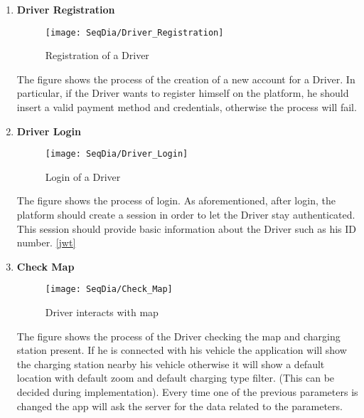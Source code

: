 \begin{enumerate}
        \newpage
        \item \textbf{Driver Registration}
        \begin{figure}[H]
            \begin{center}
            \texttt{[image: SeqDia/Driver\_Registration]}
            \caption{Registration of a Driver}
            \label{fig:DriverRegistration}
            \end{center}
        \end{figure}
        The figure shows the process of the creation of a new account for a Driver. In particular, if the Driver wants to register himself on the platform, he should insert a valid payment method and credentials, otherwise the process will fail.
        \newpage
        \item \textbf{Driver Login}
        \begin{figure}[H]
            \begin{center}
            \texttt{[image: SeqDia/Driver\_Login]}
            \caption{Login of a Driver}
            \label{fig:DriverLogin}
            \end{center}
        \end{figure}
        The figure shows the process of login. As aforementioned, after login, the platform should create a session in order to let the Driver stay authenticated. This session should provide basic information about the Driver such as his ID number. \ref{jwt}
        \newpage
        \item \textbf{Check Map}
        \begin{figure}[H]
            \begin{center}
            \texttt{[image: SeqDia/Check\_Map]}
            \caption{Driver interacts with map}
            \label{fig:CheckMap}
            \end{center}
        \end{figure}
        The figure shows the process of the Driver checking the map and charging station present. If he is connected with his vehicle the application will show the charging station nearby his vehicle otherwise it will show a default location with default zoom and default charging type filter. (This can be decided during implementation). Every time one of the previous parameters is changed the app will ask the server for the data related to the parameters.

\end{enumerate}
